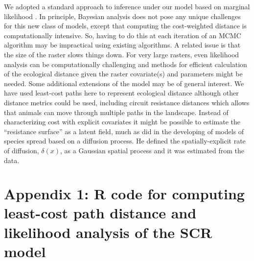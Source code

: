 \documentclass[12pt]{article}
\begin{document}
We adopted a standard approach to inference under our model based on
marginal likelihood \citep{borchers_efford:2008}. In principle,
Bayesian analysis does not pose any unique challenges for this new
class of models, except that computing the cost-weighted distance is
computationally intensive.
 So, having to do this at each iteration of an
MCMC algorithm may be impractical using existing algorithms.
A related issue is that the size of the raster slows things down. For
very large rasters, even likelihood analysis can be computationally
challenging and methods for efficient calculation of the ecological distance
given the raster covariate(s) and parameters might be needed.
Some additional extensions of the model may be of general
interest. 
We have used least-cost paths here to represent ecological distance although
other distance metrics could be used, including circuit resistance distances
\citep{mcrae:2006} which allows that animals can move through multiple paths 
in the landscape.
Instead of characterizing cost with 
explicit covariates it might be possible to estimate the
``resistance surface'' as a latent field, much as \citep{wikle:2003}
 did in the developing of models of species spread based on a
 diffusion process. He defined the spatially-explicit rate of
diffusion, $\delta(x)$, as a Gaussian spatial process and it was
estimated from the data.  













\newpage



\newpage






\section*{Appendix 1: {\bf R} code for computing least-cost path
  distance and likelihood analysis of the SCR model}
\end{document}

